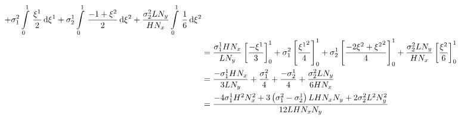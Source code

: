 \begin{equation}
\begin{aligned}
    +\conductivitytensorsymbol^{2}_{1}\gint{0}{1}{\dfrac{\xione}{2}}{\xione}
    +\conductivitytensorsymbol^{1}_{2}\gint{0}{1}{\dfrac{-1+\xitwo}{2}}{\xitwo}
    +\dfrac{\conductivitytensorsymbol^{2}_{2} L N_{y}}{H N_{x}}\gint{0}{1}{\dfrac{1}{6}}{\xitwo} \\
    &=\dfrac{\conductivitytensorsymbol^{1}_{1} H N_{x}}{L N_{y}}\sqbrac{\dfrac{-\xione}{3}}^{1}_{0}
    +\conductivitytensorsymbol^{2}_{1}\sqbrac{\dfrac{\xionesq}{4}}^{1}_{0}
    +\conductivitytensorsymbol^{1}_{2}\sqbrac{\dfrac{-2\xitwo+\xitwosq}{4}}^{1}_{0}
    +\dfrac{\conductivitytensorsymbol^{2}_{2} L N_{y}}{H N_{x}}\sqbrac{\dfrac{\xitwo}{6}}^{1}_{0} \\
    &=\dfrac{-\conductivitytensorsymbol^{1}_{1} H N_{x}}{3 L N_{y}}+\dfrac{\conductivitytensorsymbol^{2}_{1}}{4}+
    \dfrac{-\conductivitytensorsymbol^{1}_{2}}{4}+\dfrac{\conductivitytensorsymbol^{2}_{2} L N_{y}}{6 H N_{x}} \\
    &=\dfrac{-4\conductivitytensorsymbol^{1}_{1}H^{2}N_{x}^{2}+3\pbrac{\conductivitytensorsymbol^{2}_{1}-
        \conductivitytensorsymbol^{1}_{2}}L H N_{x} N_{y}+2\conductivitytensorsymbol^{2}_{2}L^{2}N_{y}^{2}}{12 L H N_{x} N_{y}}
  \end{aligned}
\end{equation}

